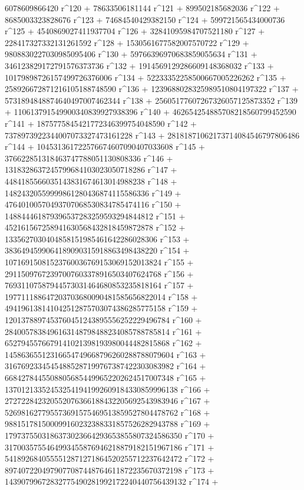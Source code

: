        6078609866420 r^120 + 78633506181144 r^121 + 
       899502185682036 r^122 + 8685003323828676 r^123 + 
       74684540429382150 r^124 + 599721565434000736 r^125 + 
       4540869027411937704 r^126 + 32841095984707521180 r^127 + 
       228417327332131261592 r^128 + 1530561677582007570722 r^129 + 
       9808830227030985095406 r^130 + 59766396970683859055634 r^131 + 
       346123829172791576373736 r^132 + 
       1914569129286609148368032 r^133 + 
       10179898726157499726376006 r^134 + 
       52233352258500667005226262 r^135 + 
       258926672871216105188748590 r^136 + 
       1239688028325989510804197322 r^137 + 
       5731894848874640497007462344 r^138 + 
       25605177607267326057125873352 r^139 + 
       110613791549900340839927938396 r^140 + 
       462654254885708218560799452590 r^141 + 
       1875775845421772346399754048590 r^142 + 
       7378973922344007073327473161228 r^143 + 
       28181871062173714084546797806486 r^144 + 
       104531361722576674607090407033608 r^145 + 
       376622851318463747788051130808336 r^146 + 
       1318328637245799684103023050718286 r^147 + 
       4484185566035143831674613014988238 r^148 + 
       14824320559999861280436874115586336 r^149 + 
       47640100570493707068530834785474116 r^150 + 
       148844461879396537283259593294844812 r^151 + 
       452161567258941630568432818459872878 r^152 + 
       1335627030404858151985461642286028306 r^153 + 
       3836494599064189090315918863498438220 r^154 + 
       10716915081523760036769153069152013824 r^155 + 
       29115097672397007603378916503407624768 r^156 + 
       76931107587944573031464680853235818164 r^157 + 
       197711188647203703680090481585656822014 r^158 + 
       494196138141042512875703074386285775158 r^159 + 
       1201378897453760451243895556252229496784 r^160 + 
       2840057838496163148798488234085788785814 r^161 + 
       6527945576679141021398193980044482815868 r^162 + 
       14586365512316654749668796260288788079604 r^163 + 
       31676923345454885287199767387422303083982 r^164 + 
       66842784455088056854499652202624517007348 r^165 + 
       137012133524532541941992609184330859996138 r^166 + 
       272722842320552076366188432205692543983946 r^167 + 
       526981627795573691575469513859527804478762 r^168 + 
       988151781500099160232388331857526282943788 r^169 + 
       1797375503186373023664293653855807324586350 r^170 + 
       3170035755464993455876946218879182151967186 r^171 + 
       5418926840555512871271864520255712237642472 r^172 + 
       8974072204979077087448764611872235670372198 r^173 + 
       14390799672832775490281992172240440756439132 r^174 + 
